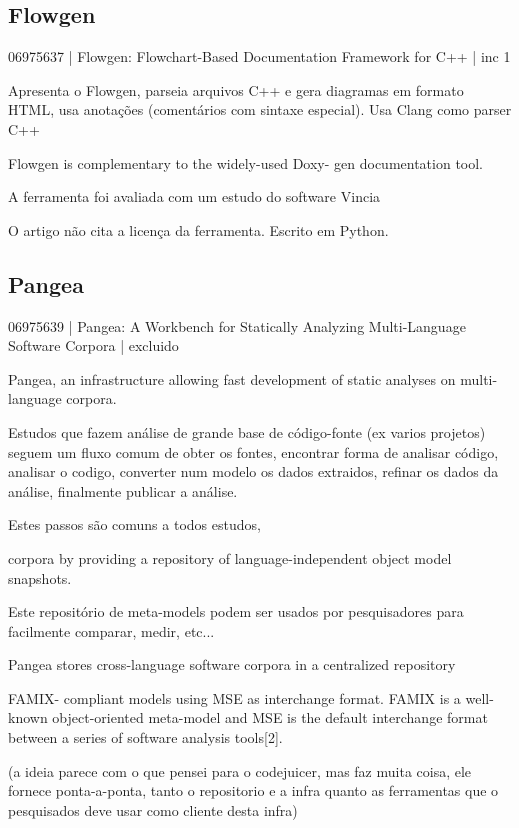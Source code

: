 \subsection{Flowgen}

06975637 | Flowgen: Flowchart-Based Documentation Framework for C++ | inc 1

Apresenta o Flowgen, parseia arquivos C++ e gera diagramas em formato HTML, usa
anotações (comentários com sintaxe especial). Usa Clang como parser C++

Flowgen is complementary to the widely-used Doxy-
gen documentation tool.

A ferramenta foi avaliada com um estudo do software Vincia

O artigo não cita a licença da ferramenta. Escrito em Python.

\subsection{Pangea}

06975639 | Pangea: A Workbench for Statically Analyzing Multi-Language Software Corpora | excluido

Pangea,
an infrastructure allowing fast
development of static analyses on multi-language corpora.

Estudos que fazem análise de grande base de código-fonte (ex varios projetos)
seguem um fluxo comum de obter os fontes, encontrar forma de analisar código,
analisar o codigo, converter num modelo os dados extraidos, refinar os dados
da análise, finalmente publicar a análise.

Estes passos são comuns a todos estudos, 

corpora by providing a
repository of language-independent object model snapshots.

Este repositório de meta-models podem ser usados por pesquisadores para
facilmente comparar, medir, etc...

Pangea stores cross-language software corpora in a centralized repository

FAMIX-
compliant models using MSE as interchange format.
FAMIX is a well-known object-oriented meta-model and
MSE is the default interchange format between a series
of software analysis tools[2].

(a ideia parece com o que pensei para o codejuicer, mas faz muita coisa, ele
fornece ponta-a-ponta, tanto o repositorio e a infra quanto as ferramentas que
o pesquisados deve usar como cliente desta infra)

